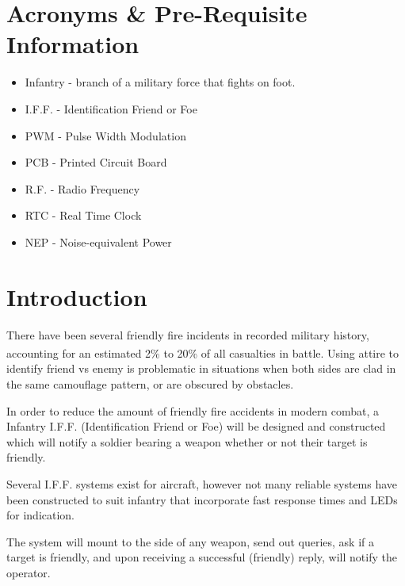 \documentclass[openbib,letterpaper,10pt]{article}
\newcommand{\buildtoc}{
	\clearpage
	\singlespacing
	\tableofcontents
	\onehalfspacing
}
\begin{document}
\maketitle
\pagestyle{fancy}
\begin{spacing}{1.15}


\color{black}
\buildtoc
{}
\section*{Acronyms \& Pre-Requisite Information}
\begin{itemize}
	\item Infantry - branch of a military force that fights on foot.
	\item I.F.F. - Identification Friend or Foe
	\item PWM - Pulse Width Modulation
	\item PCB - Printed Circuit Board
	\item R.F. - Radio Frequency
	\item RTC - Real Time Clock
	\item NEP - Noise-equivalent Power
\end{itemize}
\clearpage
\setcounter{page}{1}

\section{Introduction}
There have been several friendly fire incidents in recorded military history, accounting for an estimated 2\% to 20\% of all casualties in battle\textsuperscript{\cite{USArmy}}. Using attire to identify friend vs enemy is problematic in situations when both sides are clad in the same camouflage pattern, or are obscured by obstacles.

In order to reduce the amount of friendly fire accidents in modern combat, a Infantry I.F.F. (Identification Friend or Foe) will be designed and constructed which will notify a soldier bearing a weapon whether or not their target is friendly.

Several I.F.F. systems exist for aircraft, however not many reliable systems have been constructed to suit infantry that incorporate fast response times and LEDs for indication.

The system will mount to the side of any weapon, send out queries, ask if a target is friendly, and upon receiving a successful (friendly) reply, will notify the operator.


\end{spacing}
\end{document}
